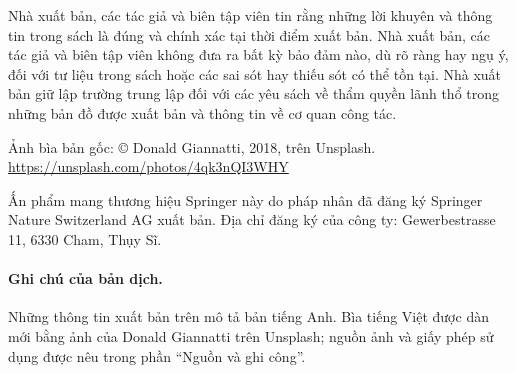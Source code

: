 Nhà xuất bản, các tác giả và biên tập viên tin rằng những lời khuyên và thông tin trong sách là đúng và chính xác tại thời điểm xuất bản. Nhà xuất bản, các tác giả và biên tập viên không đưa ra bất kỳ bảo đảm nào, dù rõ ràng hay ngụ ý, đối với tư liệu trong sách hoặc các sai sót hay thiếu sót có thể tồn tại. Nhà xuất bản giữ lập trường trung lập đối với các yêu sách về thẩm quyền lãnh thổ trong những bản đồ được xuất bản và thông tin về cơ quan công tác.

Ảnh bìa bản gốc: \copyright{} Donald Giannatti, 2018, trên Unsplash.\\
\url{https://unsplash.com/photos/4qk3nQI3WHY}

Ấn phẩm mang thương hiệu Springer này do pháp nhân đã đăng ký Springer Nature Switzerland AG xuất bản. Địa chỉ đăng ký của công ty: Gewerbestrasse 11, 6330 Cham, Thụy Sĩ.

\paragraph{Ghi chú của bản dịch.} Những thông tin xuất bản trên mô tả bản tiếng Anh. Bìa tiếng Việt được dàn mới bằng ảnh của Donald Giannatti trên Unsplash; nguồn ảnh và giấy phép sử dụng được nêu trong phần ``Nguồn và ghi công''.
